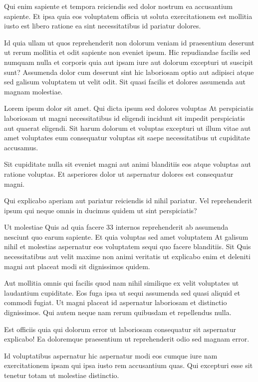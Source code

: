 Qui enim sapiente et tempora reiciendis sed dolor nostrum ea accusantium sapiente. Et ipsa quia eos voluptatem officia ut soluta exercitationem est mollitia iusto est libero ratione ea sint necessitatibus id pariatur dolores.

Id quia ullam ut quos reprehenderit non dolorum veniam id praesentium deserunt ut rerum mollitia et odit sapiente non eveniet ipsum. Hic repudiandae facilis sed numquam nulla et corporis quia aut ipsam iure aut dolorum excepturi ut suscipit sunt? Assumenda dolor cum deserunt sint hic laboriosam optio aut adipisci atque sed galisum voluptatem ut velit odit. Sit quasi facilis et dolores assumenda aut magnam molestiae.

Lorem ipsum dolor sit amet. Qui dicta ipsum sed dolores voluptas At perspiciatis laboriosam ut magni necessitatibus id eligendi incidunt sit impedit perspiciatis aut quaerat eligendi. Sit harum dolorum et voluptas excepturi ut illum vitae aut amet voluptates eum consequatur voluptas sit saepe necessitatibus ut cupiditate accusamus.

Sit cupiditate nulla sit eveniet magni aut animi blanditiis eos atque voluptas aut ratione voluptas. Et asperiores dolor ut aspernatur dolores est consequatur magni.

Qui explicabo aperiam aut pariatur reiciendis id nihil pariatur. Vel reprehenderit ipsum qui neque omnis in ducimus quidem ut sint perspiciatis?

Ut molestiae Quis ad quia facere 33 internos reprehenderit ab assumenda nesciunt quo earum sapiente. Et quia voluptas sed amet voluptatem At galisum nihil et molestias aspernatur eos voluptatem sequi quo facere blanditiis. Sit Quis necessitatibus aut velit maxime non animi veritatis ut explicabo enim et deleniti magni aut placeat modi sit dignissimos quidem.

Aut mollitia omnis qui facilis quod nam nihil similique ex velit voluptates ut laudantium cupiditate. Eos fuga ipsa ut sequi assumenda sed quasi aliquid et commodi fugiat. Ut magni placeat id aspernatur laboriosam et distinctio dignissimos. Qui autem neque nam rerum quibusdam et repellendus nulla.

Est officiis quia qui dolorum error ut laboriosam consequatur sit aspernatur explicabo! Ea doloremque praesentium ut reprehenderit odio sed magnam error.

Id voluptatibus aspernatur hic aspernatur modi eos cumque iure nam exercitationem ipsam qui ipsa iusto rem accusantium quas. Qui excepturi esse sit tenetur totam ut molestiae distinctio.

